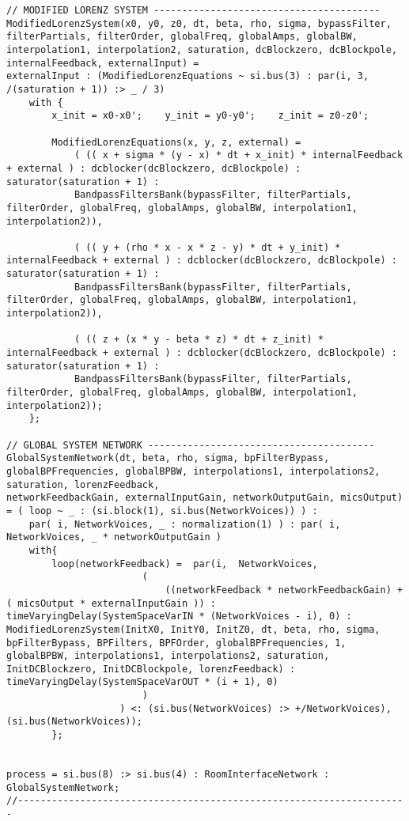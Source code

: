 \begin{lstlisting}
// MODIFIED LORENZ SYSTEM ----------------------------------------
ModifiedLorenzSystem(x0, y0, z0, dt, beta, rho, sigma, bypassFilter, filterPartials, filterOrder, globalFreq, globalAmps, globalBW, interpolation1, interpolation2, saturation, dcBlockzero, dcBlockpole, internalFeedback, externalInput) = 
externalInput : (ModifiedLorenzEquations ~ si.bus(3) : par(i, 3, /(saturation + 1)) :> _ / 3)
    with {
        x_init = x0-x0';    y_init = y0-y0';    z_init = z0-z0';

        ModifiedLorenzEquations(x, y, z, external) = 
            ( (( x + sigma * (y - x) * dt + x_init) * internalFeedback + external ) : dcblocker(dcBlockzero, dcBlockpole) : saturator(saturation + 1) : 
            BandpassFiltersBank(bypassFilter, filterPartials, filterOrder, globalFreq, globalAmps, globalBW, interpolation1, interpolation2)), 

            ( (( y + (rho * x - x * z - y) * dt + y_init) * internalFeedback + external ) : dcblocker(dcBlockzero, dcBlockpole) : saturator(saturation + 1) : 
            BandpassFiltersBank(bypassFilter, filterPartials, filterOrder, globalFreq, globalAmps, globalBW, interpolation1, interpolation2)), 

            ( (( z + (x * y - beta * z) * dt + z_init) * internalFeedback + external ) : dcblocker(dcBlockzero, dcBlockpole) : saturator(saturation + 1) : 
            BandpassFiltersBank(bypassFilter, filterPartials, filterOrder, globalFreq, globalAmps, globalBW, interpolation1, interpolation2));
    };

// GLOBAL SYSTEM NETWORK ----------------------------------------
GlobalSystemNetwork(dt, beta, rho, sigma, bpFilterBypass, globalBPFrequencies, globalBPBW, interpolations1, interpolations2, saturation, lorenzFeedback,
networkFeedbackGain, externalInputGain, networkOutputGain, micsOutput) = ( loop ~ _ : (si.block(1), si.bus(NetworkVoices)) ) : 
    par( i, NetworkVoices, _ : normalization(1) ) : par( i, NetworkVoices, _ * networkOutputGain )
    with{
        loop(networkFeedback) =  par(i,  NetworkVoices,
                        ( 
                            ((networkFeedback * networkFeedbackGain) + ( micsOutput * externalInputGain )) : timeVaryingDelay(SystemSpaceVarIN * (NetworkVoices - i), 0) : ModifiedLorenzSystem(InitX0, InitY0, InitZ0, dt, beta, rho, sigma, bpFilterBypass, BPFilters, BPFOrder, globalBPFrequencies, 1, globalBPBW, interpolations1, interpolations2, saturation, InitDCBlockzero, InitDCBlockpole, lorenzFeedback) : timeVaryingDelay(SystemSpaceVarOUT * (i + 1), 0) 
                        )
                    ) <: (si.bus(NetworkVoices) :> +/NetworkVoices), (si.bus(NetworkVoices));
        };
           
              
process = si.bus(8) :> si.bus(4) : RoomInterfaceNetwork : GlobalSystemNetwork;
//---------------------------------------------------------------------
\end{lstlisting}

